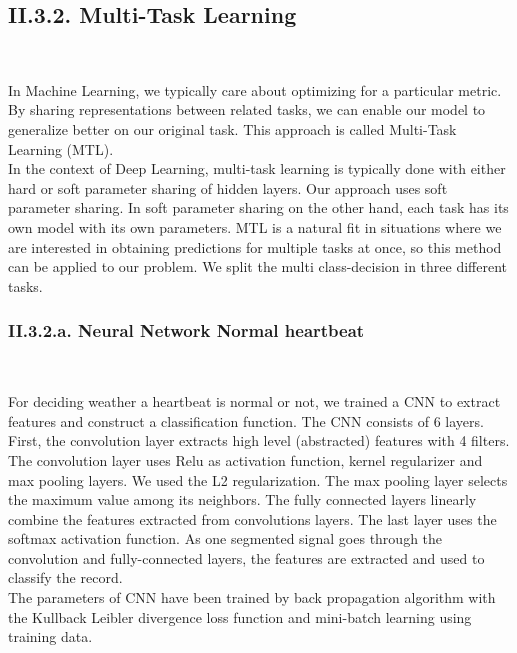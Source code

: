 \documentclass[11pt, a4papper]{report}
\theoremstyle{plain}
\theoremstyle{definition}
\theoremstyle{definition}
\theoremstyle{proposition}
\begin{document}
\subsection*{II.3.2. Multi-Task Learning}

\

In Machine Learning, we typically care about optimizing for a particular metric. By sharing representations between related tasks, we can enable our model to generalize better on our original task. This approach is called Multi-Task Learning (MTL).
\\

In the context of Deep Learning, multi-task learning is typically done with either hard or soft parameter sharing of hidden layers. Our approach uses soft parameter sharing. In soft parameter sharing on the other hand, each task has its own model with its own parameters. MTL is a natural fit in situations where we are interested in obtaining predictions for multiple tasks at once, so this method can be applied to our problem. We split the multi class-decision in three different tasks. \cite{23}

\subsubsection*{II.3.2.a. Neural Network Normal heartbeat}

\

For deciding weather a heartbeat is normal or not, we trained a CNN to extract features and construct a classification function. The CNN consists of 6 layers.
\\

First, the convolution layer extracts high level (abstracted) features with 4 filters. The convolution layer uses Relu as activation function, kernel regularizer and max pooling layers. We used the L2 regularization. The max pooling layer selects the maximum value among its neighbors. The fully connected layers linearly combine the features extracted from convolutions layers. The last layer uses the softmax activation function. As one segmented signal goes through the convolution and fully-connected layers, the features are extracted and used to classify the record.
\\

The parameters of CNN have been trained by back propagation algorithm with the Kullback Leibler divergence loss function and mini-batch learning using training data.
\\
\end{document}
